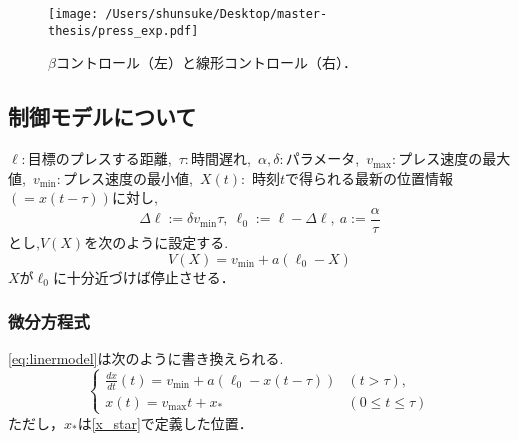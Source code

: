 \documentclass [dvipdfmx] {jsarticle}
\numberwithin{equation}{section}
\theoremstyle{definition} %
\theoremstyle{definition} %
\begin{document}
\begin{figure}[hbt]
    \centering
    \texttt{[image: /Users/shunsuke/Desktop/master-thesis/press\_exp.pdf]}
    \caption{$\beta$コントロール（左）と線形コントロール（右）．}
    \label{Sample p.2}
\end{figure}
\subsection{制御モデルについて}
$\ell:$目標のプレスする距離,\ $\tau:$時間遅れ,\ $\alpha,\delta:$パラメータ,\ 
$v_{\max}:$プレス速度の最大値,\ $v_{\min}:$プレス速度の最小値,\ $X(t):$
時刻$t$で得られる最新の位置情報$(=x(t-\tau))$に対し,
\begin{equation}
    \Delta\ell :=\delta v_{\min}\tau,\ \ell_0:=\ell-\Delta\ell,\ a:=\frac{\alpha}{\tau}
\end{equation}
とし,$V(X)$を次のように設定する.
\begin{equation}\label{eq:linermodel}
    V(X)=v_{\min}+a(\ell_0-X)
\end{equation}
$X$が$\ell_0$に十分近づけば停止させる．


\subsubsection{微分方程式}
\eqref{eq:linermodel}は次のように書き換えられる.
\begin{equation}\label{eq:liner}\begin{cases}
    \displaystyle\frac{dx}{dt}(t)=v_{\min}+a(\ell_0-x(t-\tau)) &(t>\tau),\\
    x(t)=v_{\max}t+x_\ast &(0\le t \le \tau)
\end{cases}\end{equation}
ただし，$x_\ast$は\eqref{x_star}で定義した位置．
\end{document}
